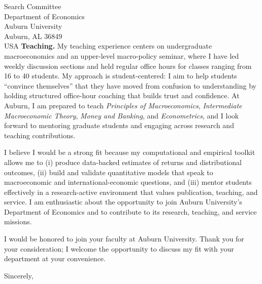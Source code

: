 \documentclass[11pt,letterpaper]{letter}
\begin{document}
\begin{letter}{Search Committee \\
Department of Economics \\
Auburn University \\
Auburn, AL 36849 \\ USA}
\textbf{Teaching.} My teaching experience centers on undergraduate macroeconomics and an upper-level macro-policy seminar, where I have led weekly discussion sections and held regular office hours for classes ranging from 16 to 40 students. My approach is student-centered: I aim to help students “convince themselves” that they have moved from confusion to understanding by holding structured office-hour coaching that builds trust and confidence. At Auburn, I am prepared to teach \textit{Principles of Macroeconomics}, \textit{Intermediate Macroeconomic Theory}, \textit{Money and Banking}, and \textit{Econometrics}, and I look forward to mentoring graduate students and engaging across research and teaching contributions.

I believe I would be a strong fit because my computational and empirical toolkit allows me to (i) produce data-backed estimates of returns and distributional outcomes, (ii) build and validate quantitative models that speak to macroeconomic and international-economic questions, and (iii) mentor students effectively in a research-active environment that values publication, teaching, and service. I am enthusiastic about the opportunity to join Auburn University’s Department of Economics and to contribute to its research, teaching, and service missions.

I would be honored to join your faculty at Auburn University. Thank you for your consideration; I welcome the opportunity to discuss my fit with your department at your convenience.

\closing{Sincerely,}

\end{letter}
\end{document}
